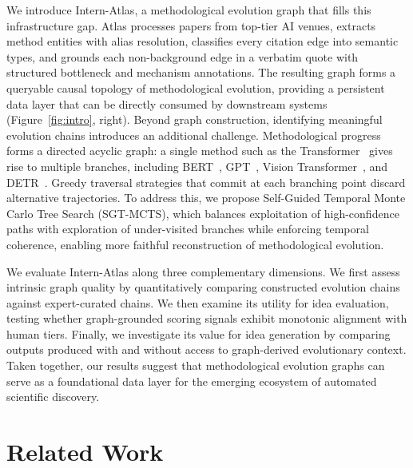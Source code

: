 \documentclass{llmxive}
\begin{document}
We introduce Intern-Atlas, a methodological evolution graph that fills this infrastructure gap. Atlas processes papers from top-tier AI venues, extracts method entities with alias resolution, classifies every citation edge into semantic types, and grounds each non-background edge in a verbatim quote with structured bottleneck and mechanism annotations. The resulting graph forms a queryable causal topology of methodological evolution, providing a persistent data layer that can be directly consumed by downstream systems (Figure~\ref{fig:intro}, right). Beyond graph construction, identifying meaningful evolution chains introduces an additional challenge. Methodological progress forms a directed acyclic graph: a single method such as the Transformer~\cite{vaswani2017attention} gives rise to multiple branches, including BERT~\cite{devlin2019bert}, GPT~\cite{radford2018improving,radford2019language,brown2020language}, Vision Transformer~\cite{dosovitskiy2020image,khan2022transformers,han2022survey}, and DETR~\cite{carion2020end}. Greedy traversal strategies that commit at each branching point discard alternative trajectories. To address this, we propose Self-Guided Temporal Monte Carlo Tree Search (SGT-MCTS), which balances exploitation of high-confidence paths with exploration of under-visited branches while enforcing temporal coherence, enabling more faithful reconstruction of methodological evolution.

We evaluate Intern-Atlas along three complementary dimensions. We first assess intrinsic graph quality by quantitatively comparing constructed evolution chains against expert-curated chains. We then examine its utility for idea evaluation, testing whether graph-grounded scoring signals exhibit monotonic alignment with human tiers. Finally, we investigate its value for idea generation by comparing outputs produced with and without access to graph-derived evolutionary context. Taken together, our results suggest that methodological evolution graphs can serve as a foundational data layer for the emerging ecosystem of automated scientific discovery.

\section{Related Work}
\end{document}
